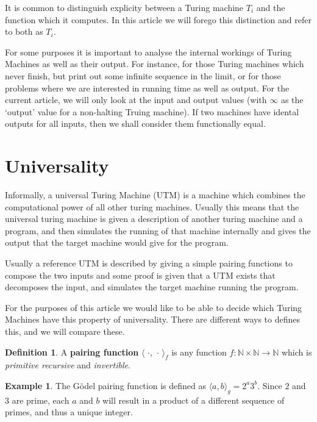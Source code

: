 \documentclass{article}
\theoremstyle{definition}
\newtheorem*{dfn}{Definition}
\newtheorem*{exm}{Example}
\begin{document}
It is common to distinguish explicity between a Turing machine $T_i$ and the function which it computes. In this article we will forego this distinction and refer to both as $T_i$.

For some purposes it is important to analyse the internal workings of Turing Machines as well as their output. For instance, for those Turing machines which never finish, but print out some infinite sequence in the limit, or for those problems where we are interested in running time as well as output. For the current article, we will only look at the input and output values (with $\infty$ as the `output' value for a non-halting Truing machine). If two machines have idental outputs for all inputs, then we shall consider them functionally equal.

\section*{Universality}

Informally, a universal Turing Machine (UTM) is a machine which combines the computational power of all other turing machines. Usually this means that the universal turing machine is given a description of another turing machine and a program, and then simulates the running of that machine internally and gives the output that the target machine would give for the program.

Usually a reference UTM is described by giving a simple pairing functions to compose the two inputs and some proof is given that a UTM exists that decomposes the input, and simulates the target machine running the program.

For the purposes of this article we would like to be able to decide which Turing Machines have this property of universality. There are different ways to defines this, and we will compare these.

\begin{dfn}
A \textbf{pairing function} $\langle\,\,\cdot,\,\cdot\,\rangle_f$ is any function $f: \mathbb{N} \times \mathbb{N} \rightarrow \mathbb{N}$ which is \emph{primitive recursive} and \emph{invertible}.
\end{dfn}

\begin{exm} The G\"{o}del pairing function is defined as $\langle a, b \rangle_g = 2^a3^b$. Since $2$ and $3$ are prime, each $a$ and $b$ will result in a product of a different sequence of primes, and thus a unique integer.
\end{exm}
\end{document}
